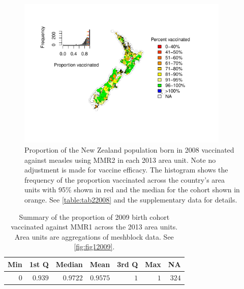 \documentclass{article}
\begin{document}
\begin{figure}
\begin{center}
    \includegraphics[width=0.9\textwidth]{nir_census_MMR2_NIR_2008.pdf}
 \end{center}
    \caption{Proportion of the New Zealand population born in 2008 vaccinated against measles using MMR2 in each 2013 area unit. Note no adjustment is made for vaccine efficacy. The histogram shows the frequency of the proportion vaccinated across the country's area units with 95\% shown in red and the median for the cohort shown in orange. See \autoref{table:tab22008} and the supplementary data for details.}
\label{fig:fig22008}
\end{figure}

 \vspace{5mm} %
\begin{table}
\begin{center}
\begin{tabular}{rrrrrrr}
\hline\hline
\multicolumn{1}{c}{Min}&\multicolumn{1}{c}{1st Q}&\multicolumn{1}{c}{Median}&\multicolumn{1}{c}{Mean}&\multicolumn{1}{c}{3rd Q}&\multicolumn{1}{c}{Max}&\multicolumn{1}{c}{NA}\tabularnewline
\hline
$0$&$0.939$&$0.9722$&$0.9575$&$1$&$1$&$324$\tabularnewline
\hline
\end{tabular}\end{center}\caption{Summary of the proportion of 2009 birth cohort vaccinated against MMR1 across the 2013 area units. Area units are aggregations of meshblock data. See \autoref{fig:fig12009}.}
\label{table:tab12009}
\end{table}
\end{document}
